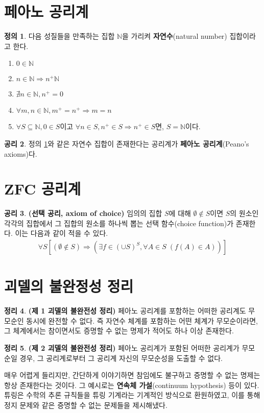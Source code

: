 \documentclass[b5paper, 11pt]{book}
\theoremstyle{definition}
\newtheorem{defn}{정의}[chapter]
\newtheorem{thm}[defn]{정리}
\newtheorem{axm}[defn]{공리}
\begin{document}
\section{페아노 공리계}
\begin{defn}\label{Ndefn}
    다음 성질들을 만족하는 집합 $\mathbb{N}$을 가리켜 \textbf{자연수}(natural number) 집합이라고 한다.
    \begin{enumerate}
        \item $0 \in \mathbb{N}$
        \item $n \in \mathbb{N} \Rightarrow n^+ \mathbb{N}$
        \item $\nexists n \in \mathbb{N}, n^+ = 0$
        \item $\forall m, n \in \mathbb{N}, m^+ = n^+ \Rightarrow m = n$
        \item $\forall S \subseteq \mathbb{N}, 0 \in S$이고 $\forall n \in S, n^+ \in S \Rightarrow n^+ \in S$면, $S = \mathbb{N}$이다.
    \end{enumerate}
\end{defn}
\begin{axm}
    정의 \ref{Ndefn}와 같은 자연수 집합이 존재한다는 공리계가 \textbf{페아노 공리계}(Peano's axioms)다.
\end{axm}
\section{ZFC 공리계}
\begin{axm}
    \label{axiom of choice}
    \textbf{(선택 공리, axiom of choice)} 임의의 집합 $S$에 대해 $\emptyset \notin S$이면
    $S$의 원소인 각각의 집합에서 그 집합의 원소를 하나씩 뽑는 선택 함수(choice function)가
    존재한다. 이는 다음과 같이 적을 수 있다.
    \begin{align*}
        \forall S [(\emptyset \notin S) \Rightarrow (\exists f 
        \in (\cup S)^S, \forall A \in S  \; (f (A) \in A))]
    \end{align*} 
\end{axm}
\section{괴델의 불완정성 정리}
\begin{thm}
    \textbf{(제 1 괴델의 불완전성 정리)} 페아노 공리계를 포함하는 어떠한 공리계도 무모순인 동시에 완전할 수 없다. 즉 자연수 체계를 포함하는 어떤 체계가 무모순이라면, 그 체계에서는 참이면서도 증명할 수 없는 명제가 적어도 하나 이상 존재한다.
\end{thm}
\begin{thm}
    \textbf{(제 2 괴델의 불완전성 정리)} 페아노 공리계가 포함된 어떠한 공리계가 무모순일 경우, 그 공리계로부터 그 공리계 자신의 무모순성을 도출할 수 없다.
\end{thm}
매우 어렵게 들리지만, 간단하게 이야기하면 참임에도 불구하고 증명할 수 없는 명제는 항상 존재한다는 것이다. 그 예시로는 \textbf{연속체 가설}(continuum hypothesis) 등이 있다. 튜링은 수학의 추론 규칙들을 튜링 기계라는 기계적인 방식으로 환원하였고, 이를 통해 정지 문제와 같은 증명할 수 없는 문제들을 제시해냈다.


\nocite{*}
\end{document}
